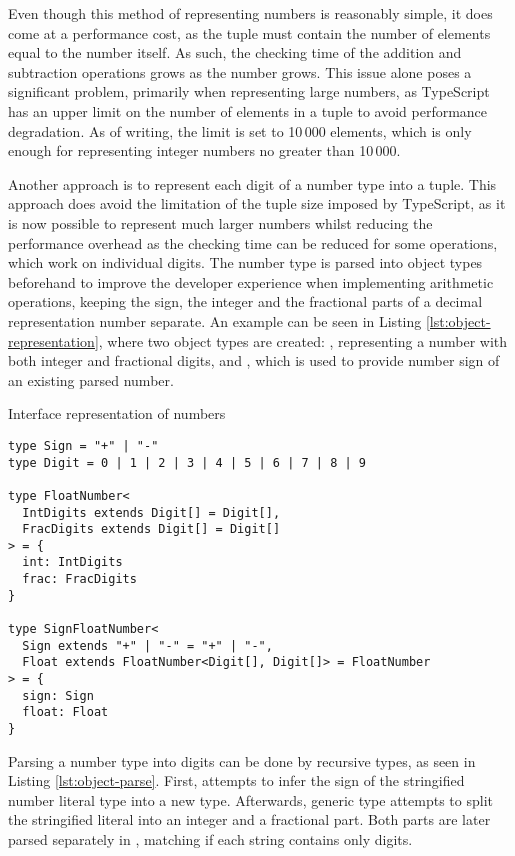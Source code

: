 Even though this method of representing numbers is reasonably simple, it does come at a performance cost, as the tuple must contain the number of elements equal to the number itself. As such, the checking time of the addition and subtraction operations grows as the number grows. This issue alone poses a significant problem, primarily when representing large numbers, as TypeScript has an upper limit on the number of elements in a tuple to avoid performance degradation. As of writing, the limit is set to 10\,000 elements\cite{ImplementationCheckerTs2023}, which is only enough for representing integer numbers no greater than 10\,000.

Another approach is to represent each digit of a number type into a tuple. This approach does avoid the limitation of the tuple size imposed by TypeScript, as it is now possible to represent much larger numbers whilst reducing the performance overhead as the checking time can be reduced for some operations, which work on individual digits. The number type is parsed into object types beforehand to improve the developer experience when implementing arithmetic operations, keeping the sign, the integer and the fractional parts of a decimal representation number separate. An example can be seen in Listing \ref{lst:object-representation}, where two object types are created: , representing a number with both integer and fractional digits, and , which is used to provide number sign of an existing parsed number.

\begin{listing}[ht]
  \caption{Interface representation of numbers}\label{lst:object-representation}
  \begin{verbatim}
type Sign = "+" | "-"
type Digit = 0 | 1 | 2 | 3 | 4 | 5 | 6 | 7 | 8 | 9

type FloatNumber<
  IntDigits extends Digit[] = Digit[],
  FracDigits extends Digit[] = Digit[]
> = {
  int: IntDigits
  frac: FracDigits
}

type SignFloatNumber<
  Sign extends "+" | "-" = "+" | "-",
  Float extends FloatNumber<Digit[], Digit[]> = FloatNumber
> = {
  sign: Sign
  float: Float
}
\end{verbatim}
\end{listing}

Parsing a number type into digits can be done by recursive types, as seen in Listing \ref{lst:object-parse}. First,  attempts to infer the sign of the stringified number literal type into a new  type. Afterwards,  generic type attempts to split the stringified literal into an integer and a fractional part. Both parts are later parsed separately in , matching if each string contains only digits.

